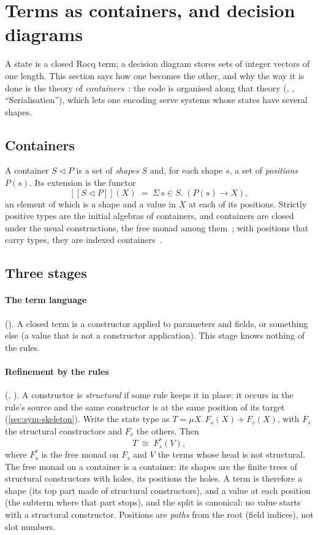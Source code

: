 \section{Terms as containers, and decision diagrams}\label{sec:containers}

A state is a closed Rocq term; a decision diagram stores sets of integer
vectors of one length. This section says how one becomes the other, and
why the way it is done is the theory of \emph{containers}~\cite{abbott05}:
the code is organised along that theory (,
, ``Serialisation''), which lets one encoding
serve systems whose states have several shapes.

\subsection{Containers}

A container $S \lhd P$ is a set of \emph{shapes} $S$ and, for each shape
$s$, a set of \emph{positions} $P(s)$. Its extension is the functor
\[
  [\![ S \lhd P ]\!](X) \;=\; \Sigma\, s \in S.\; (P(s) \to X),
\]
an element of which is a shape and a value in $X$ at each of its
positions. Strictly positive types are the initial algebras of
containers, and containers are closed under the usual constructions, the
free monad among them~\cite{abbott05}; with positions that carry types,
they are indexed containers~\cite{altenkirch15}.

\subsection{Three stages}

\paragraph{The term language} (). A closed term is a
constructor applied to parameters and fields, or something else (a value
that is not a constructor application). This stage knows nothing of the
rules.

\paragraph{Refinement by the rules} (,
). A constructor is \emph{structural} if some rule
keeps it in place: it occurs in the rule's source and the same
constructor is at the same position of its target
(\cref{sec:sym-skeleton}). Write the state type as $T = \mu X.\, F_s(X) +
F_v(X)$, with $F_s$ the structural constructors and $F_v$ the others. Then
\[
  T \;\cong\; F_s^{*}(V),
\]
where $F_s^{*}$ is the free monad on $F_s$ and $V$ the terms whose head
is not structural. The free monad on a container is a container: its
shapes are the finite trees of structural constructors with holes, its
positions the holes. A term is therefore a shape (its top part made of
structural constructors), and a value at each position (the subterm
where that part stops), and the split is canonical: no value starts with
a structural constructor. Positions are \emph{paths} from the root (field
indices), not slot numbers.

